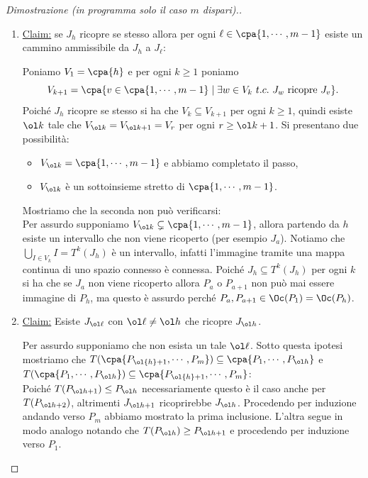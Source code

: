 \begin{proof}[Dimostrazione (in programma solo il caso $m$ dispari).]
\begin{enumerate}
\item \underline{Claim:} se $J_h$ ricopre se stesso allora per ogni $\ell\in \cpa{1,\cdots, m-1}$ esiste un cammino ammissibile da $J_{h}$ a $J_{\ell}$:

Poniamo $V_1=\cpa{h}$ e per ogni $k\geq1$ poniamo 
\[V_{k+1}=\cpa{v\in \cpa{1,\cdots, m-1}\mid \exists w\in V_k\ t.c.\ J_w\text{ ricopre }J_v}.\]
Poich\'e $J_{h}$ ricopre se stesso si ha che $V_k\subseteq V_{k+1}$ per ogni $k\geq 1$, quindi esiste $\ol k$ tale che $V_{\ol k}=V_{\ol k+1}=V_r$ per ogni $r\geq \ol k+1$. Si presentano due possibilit\`a:
\begin{itemize}
\item $V_{\ol k}=\cpa{1,\cdots,m-1}$ e abbiamo completato il passo,
\item $V_{\ol k}$ \`e un sottoinsieme stretto di $\cpa{1,\cdots, m-1}$.
\end{itemize} 
Mostriamo che la seconda non pu\`o verificarsi:\\
Per assurdo supponiamo $V_{\ol k}\subsetneq \cpa{1,\cdots, m-1}$, allora partendo da $h$ esiste un intervallo che non viene ricoperto (per esempio $J_a$). Notiamo che $\bigcup_{I\in V_k}I= T^k(J_{h})$ \`e un intervallo, infatti l'immagine tramite una mappa continua di uno spazio connesso \`e connessa. Poich\'e $J_{h}\subseteq T^k(J_{h})$ per ogni $k$ si ha che se $J_{a}$ non viene ricoperto allora $P_a$ o $P_{a+1}$ non pu\`o mai essere immagine di $P_{h}$, ma questo \`e assurdo perch\'e $P_a,P_{a+1}\in \Oc(P_1)=\Oc(P_{h})$.
\item \underline{Claim:} Esiste $J_{\ol \ell}$ con $\ol \ell\neq \ol h$ che ricopre $J_{\ol h}$.

Per assurdo supponiamo che non esista un tale $\ol\ell$. Sotto questa ipotesi mostriamo che $T(\cpa{P_{\ol{h}+1},\cdots,P_m})\subseteq \cpa{P_1,\cdots, P_{\ol h}}$ e $T(\cpa{P_1,\cdots, P_{\ol h}})\subseteq \cpa{P_{\ol{h}+1},\cdots,P_m}$:\\
Poich\'e $T(P_{\ol h+1})\leq P_{\ol h}$ necessariamente questo \`e il caso anche per $T(P_{\ol h+2})$, altrimenti $J_{\ol h+1}$ ricoprirebbe $J_{\ol h}$. Procedendo per induzione andando verso $P_m$ abbiamo mostrato la prima inclusione. L'altra segue in modo analogo notando che $T(P_{\ol h})\geq P_{\ol h+1}$ e procedendo per induzione verso $P_1$.


\end{enumerate}
\end{proof}
